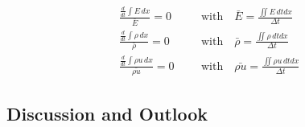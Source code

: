 \documentclass[12pt, a4paper]{article}
\begin{document}
\begin{subequations}	
\begin{align}
	\frac{\frac{d}{dt} \int E \,dx}{\bar{E}} = 0 && &\textrm{with}\quad \bar{E} = \frac{\iint E \,dtdx}{\Delta t}\label{Eq:Con1}\\
	\frac{\frac{d}{dt} \int \rho \,dx}{\bar{\rho}} = 0 && &\textrm{with}\quad \bar{\rho} = \frac{\iint \rho \,dtdx}{\Delta t}\label{Eq:Con2}\\
	\frac{\frac{d}{dt} \int \rho u \,dx}{\bar{\rho u}} = 0 && &\textrm{with}\quad \bar{\rho u} = \frac{\iint \rho u \,dtdx}{\Delta t}\label{Eq:Con3}
\end{align}
\end{subequations}


\subsection{Discussion and Outlook}
{}

\end{document}
